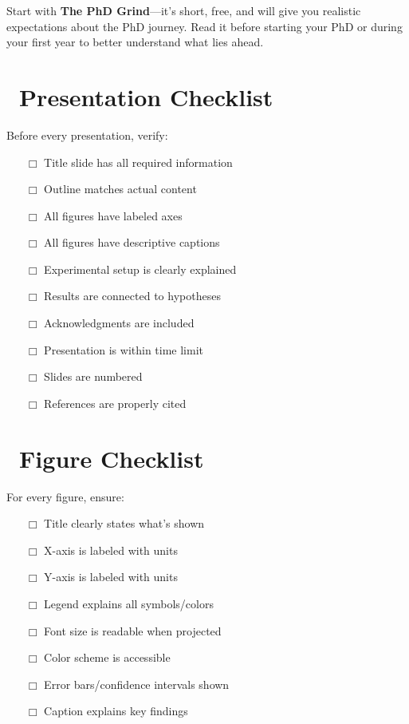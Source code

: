 \documentclass[11pt,a4paper]{article}
\begin{document}
\begin{tcolorbox}[colback=yellow!10,colframe=red!50,title=Reading Recommendation]
Start with \textbf{The PhD Grind}—it's short, free, and will give you realistic expectations about the PhD journey. Read it before starting your PhD or during your first year to better understand what lies ahead.
\end{tcolorbox}

\appendix

\newpage

\section{\faCheckCircle~Presentation Checklist}

Before every presentation, verify:

\begin{itemize}
    \item[$\Box$] Title slide has all required information
    \item[$\Box$] Outline matches actual content
    \item[$\Box$] All figures have labeled axes
    \item[$\Box$] All figures have descriptive captions
    \item[$\Box$] Experimental setup is clearly explained
    \item[$\Box$] Results are connected to hypotheses
    \item[$\Box$] Acknowledgments are included
    \item[$\Box$] Presentation is within time limit
    \item[$\Box$] Slides are numbered
    \item[$\Box$] References are properly cited
\end{itemize}

\section{\faImage~Figure Checklist}

For every figure, ensure:

\begin{itemize}
    \item[$\Box$] Title clearly states what's shown
    \item[$\Box$] X-axis is labeled with units
    \item[$\Box$] Y-axis is labeled with units
    \item[$\Box$] Legend explains all symbols/colors
    \item[$\Box$] Font size is readable when projected
    \item[$\Box$] Color scheme is accessible
    \item[$\Box$] Error bars/confidence intervals shown
    \item[$\Box$] Caption explains key findings
\end{itemize}
\end{document}
